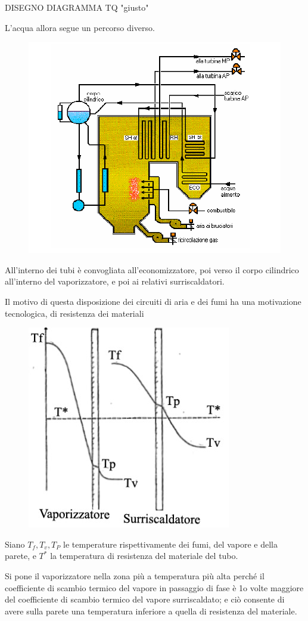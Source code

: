 \begin{adjustwidth}{2in}{}
			DISEGNO DIAGRAMMA TQ "giusto"
			
			L'acqua allora segue un percorso diverso.
			\begin{figure}[H]
				\centering
				\includegraphics[width=0.6\linewidth]{immagini/GeneratoreVapore2}
				\label{fig:generatorevapore2}
			\end{figure}
			All'interno dei tubi è convogliata all'economizzatore, poi verso il corpo cilindrico all'interno del vaporizzatore, e poi ai relativi surriscaldatori. \newline 
			
			Il motivo di questa disposizione dei circuiti di aria e dei fumi ha una motivazione tecnologica, di resistenza dei materiali
			\begin{figure}[H]
				\centering
				\includegraphics[width=0.3\linewidth]{immagini/GeneratoreVapore3}
				\label{fig:generatorevapore3}
			\end{figure}
			Siano $T_f, T_v, T_P$ le temperature rispettivamente dei fumi, del vapore e della parete, e $T^*$ la temperatura di resistenza del materiale del tubo. 
			
			Si pone il vaporizzatore nella zona più a temperatura più alta perché il coefficiente di scambio termico del vapore in passaggio di fase è 1o volte maggiore del coefficiente di scambio termico del vapore surriscaldato;
			e ciò consente di avere sulla parete una temperatura inferiore a quella di resistenza del materiale. 
			

\end{adjustwidth}
